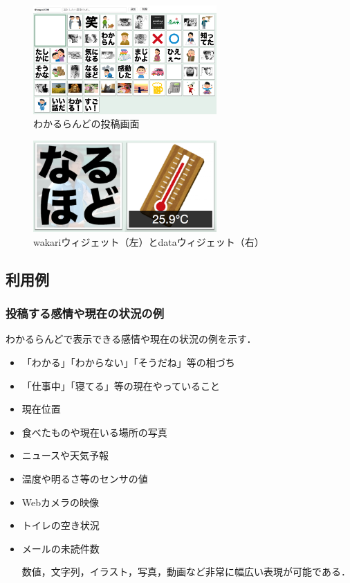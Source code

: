 \begin{figure}[h]
\centering
\includegraphics[width=7cm]{images/console.png}
\caption{わかるらんどの投稿画面}
\label{console}
\end{figure}

\begin{figure}[h]
\centering
\includegraphics[width=7cm]{images/widget.png}
\caption{wakariウィジェット（左）とdataウィジェット（右）}
\label{widget}
\end{figure}

\subsection{利用例}

\subsubsection{投稿する感情や現在の状況の例}

わかるらんどで表示できる感情や現在の状況の例を示す．

\begin{itemize}
\item 「わかる」「わからない」「そうだね」等の相づち
\item 「仕事中」「寝てる」等の現在やっていること
\item 現在位置
\item 食べたものや現在いる場所の写真
\item ニュースや天気予報
\item 温度や明るさ等のセンサの値
\item Webカメラの映像
\item トイレの空き状況
\item メールの未読件数

数値，文字列，イラスト，写真，動画など非常に幅広い表現が可能である．

\end{itemize}

